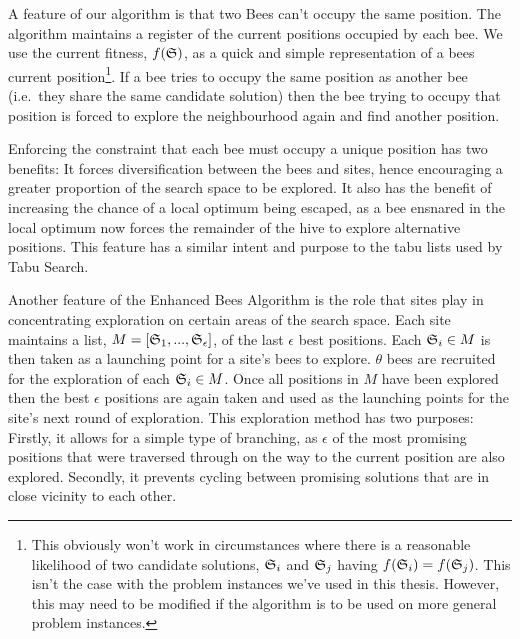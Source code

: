 
A feature of our algorithm is that two Bees can't occupy the same position. The algorithm maintains a register of the current positions occupied by each bee. We use the current fitness, $f(\mathfrak{S})$, as a quick and simple representation of a bees current position\footnote{This obviously won't work in circumstances where there is a reasonable likelihood of two candidate solutions, $\mathfrak{S}_i$ and $\mathfrak{S}_j$ having $f(\mathfrak{S}_i) = f(\mathfrak{S}_j)$. This isn't the case with the problem instances we've used in this thesis. However, this may need to be modified if the algorithm is to be used on more general problem instances.}. If a bee tries to occupy the same position as another bee (i.e.~they share the same candidate solution) then the bee trying to occupy that position is forced to explore the neighbourhood again and find another position. 

Enforcing the constraint that each bee must occupy a unique position has two benefits: It forces diversification between the bees and sites, hence encouraging a greater proportion of the search space to be explored. It also has the benefit of increasing the chance of a local optimum being escaped, as a bee ensnared in the local optimum now forces the remainder of the hive to explore alternative positions. This feature has a similar intent and purpose to the tabu lists used by Tabu Search.

Another feature of the Enhanced Bees Algorithm is the role that sites play in concentrating exploration on certain areas of the search space. Each site maintains a list, $M = [\mathfrak{S}_1,..., \mathfrak{S}_\epsilon]$, of the last $\epsilon$ best positions. Each $\mathfrak{S}_i \in M$ is then taken as a launching point for a site's bees to explore. $\theta$ bees are recruited for the exploration of each $\mathfrak{S}_i \in M$. Once all positions in $M$ have been explored then the best $\epsilon$ positions are again taken and used as the launching points for the site's next round of exploration. This exploration method has two purposes: Firstly, it allows for a simple type of branching, as $\epsilon$ of the most promising positions that were traversed through on the way to the current position are also explored. Secondly, it prevents cycling between promising solutions that are in close vicinity to each other.

